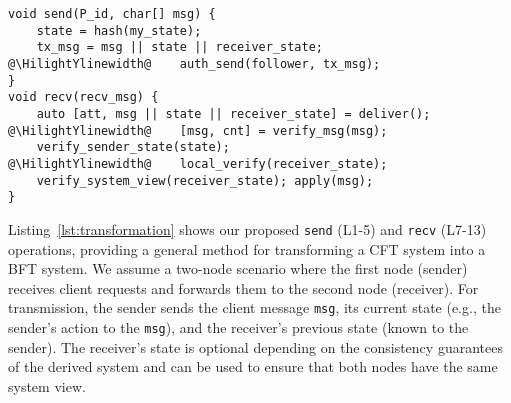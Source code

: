 {\small
\begin{lstlisting}[frame=h,style=customc,
                    label={lst:transformation},
                    caption= Generic send and recv wrapper functions using \projecttitle{}. \projecttitle additions are highlighted in orange.]
void send(P_id, char[] msg) {
    state = hash(my_state);  
    tx_msg = msg || state || receiver_state;
@\HilightYlinewidth@    auth_send(follower, tx_msg);
}
void recv(recv_msg) {
    auto [att, msg || state || receiver_state] = deliver();
@\HilightYlinewidth@    [msg, cnt] = verify_msg(msg);
    verify_sender_state(state);
@\HilightYlinewidth@    local_verify(receiver_state);
    verify_system_view(receiver_state); apply(msg);
}
\end{lstlisting}
}
\vspace{-1mm}

Listing~\ref{lst:transformation} shows our proposed {\tt send} (L1-5) and {\tt recv} (L7-13) operations, providing a general method for transforming a CFT system into a BFT system. 
We assume a two-node scenario where the first node (sender) receives client requests and forwards them to the second node (receiver). For transmission, the sender sends the client message {\tt msg}, its current state (e.g., the sender's action to the \texttt{msg}), and the receiver's previous state (known to the sender). 
The receiver's state is optional depending on the consistency guarantees of the derived system and can be used to ensure that both nodes have the same system view. 


